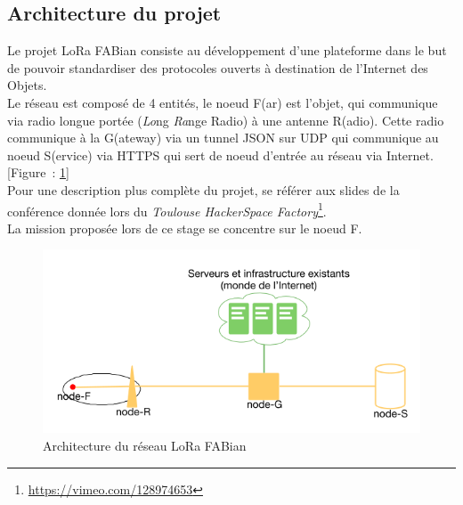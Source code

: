 \documentclass{article}
\begin{document}
\subsection{Architecture du projet}
Le projet LoRa FABian consiste au développement d'une plateforme dans le but de pouvoir standardiser des protocoles ouverts à destination de l'Internet des Objets.\\
Le réseau est composé de 4 entités, le noeud F(ar) est l'objet, qui communique via radio longue portée (\emph{Lo}ng \emph{Ra}nge Radio) à une antenne R(adio). Cette radio communique à la G(ateway) via un tunnel JSON sur UDP qui communique au noeud S(ervice) via \textsc{HTTPS} qui sert de noeud d'entrée au réseau via Internet. [Figure~: \ref{fig:archi}]\\
Pour une description plus complète du projet, se référer aux slides de la conférence donnée lors du \emph{Toulouse HackerSpace Factory}\footnote{\url{https://vimeo.com/128974653}}.\\
La mission proposée lors de ce stage se concentre sur le noeud F.
\begin{figure}[h]
	\begin{center}
		\includegraphics[scale=0.4]{../res/img/archi}
		\caption{Architecture du réseau LoRa FABian}
		\label{fig:archi}
	\end{center}
\end{figure}
\end{document}
